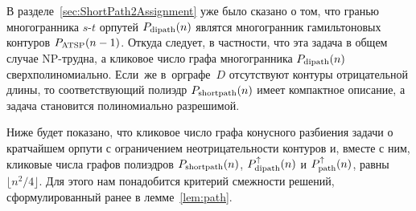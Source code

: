 В разделе~\ref{sec:ShortPath2Assignment} уже было сказано о том, что гранью многогранника $s$-$t$ орпутей $P_{\textup{dipath}}(n)$ являтся многогранник гамильтоновых контуров $P_{\textup{ATSP}}(n-1)$. Откуда следует, в частности, что эта задача в общем случае NP-трудна, а кликовое число графа многогранника $P_{\textup{dipath}}(n)$ сверхполиномиально.
Если~же в~орграфе~$D$ отсутствуют контуры отрицательной длины, то соответствующий полиэдр $P_{\textup{shortpath}}(n)$ имеет компактное описание, а задача становится полиномиально разрешимой. 

Ниже будет показано, что кликовое число графа конусного разбиения задачи о кратчайшем орпути с ограничением неотрицательности контуров и, вместе с ним, кликовые числа графов полиэдров $P_{\textup{shortpath}}(n)$, $P_{\textup{dipath}}^{\uparrow}(n)$ и $P_{\textup{path}}^{\uparrow}(n)$, равны $\lfloor n^2/4\rfloor$.
Для этого нам понадобится критерий смежности решений, сформулированный ранее в лемме~\ref{lem:path}. 

